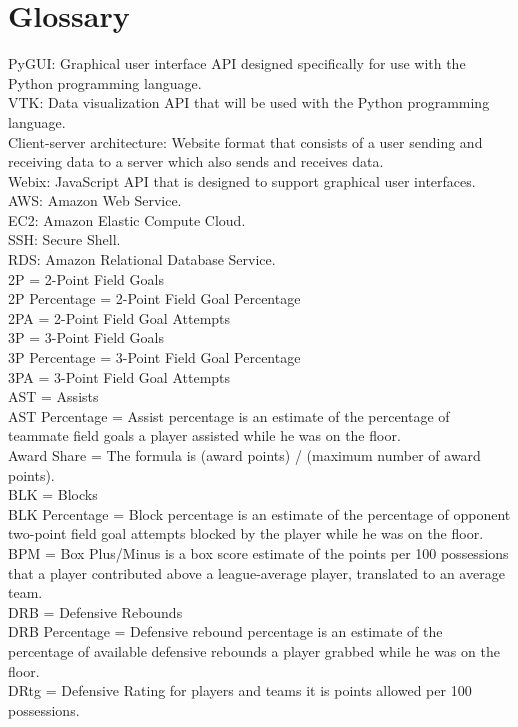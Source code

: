 \documentclass[journal,onecolumn]{IEEEtran}
\begin{document}
\section{Glossary}
PyGUI: Graphical user interface API designed specifically for use with the Python programming language. \\
VTK: Data visualization API that will be used with the Python programming language. \\
Client-server architecture: Website format that consists of a user sending and receiving data to a server which also sends and receives data. \\
Webix: JavaScript API that is designed to support graphical user interfaces. \\
AWS: Amazon Web Service.\\
EC2: Amazon Elastic Compute Cloud.\\
SSH: Secure Shell.\\
RDS: Amazon Relational Database Service.\\
2P = 2-Point Field Goals \\
2P Percentage = 2-Point Field Goal Percentage\\
2PA = 2-Point Field Goal Attempts\\
3P = 3-Point Field Goals\\
3P Percentage = 3-Point Field Goal Percentage\\
3PA = 3-Point Field Goal Attempts\\
AST = Assists\\
AST Percentage = Assist percentage is an estimate of the percentage of teammate field goals a player assisted while he was on the floor.\\
Award Share = The formula is (award points) / (maximum number of award points).\\ 
BLK = Blocks \\
BLK Percentage = Block percentage is an estimate of the percentage of opponent two-point field goal attempts blocked by the player while he was on the floor.\\
BPM = Box Plus/Minus is a box score estimate of the points per 100 possessions that a player contributed above a league-average player, translated to an average team.\\ 
DRB = Defensive Rebounds \\
DRB Percentage = Defensive rebound percentage is an estimate of the percentage of available defensive rebounds a player grabbed while he was on the floor.\\
DRtg = Defensive Rating for players and teams it is points allowed per 100 possessions. \\
\end{document}
